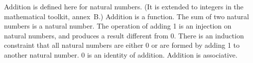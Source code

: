 \documentclass{article}
\begin{document}
Addition is defined here for natural numbers.
(It is extended to integers in the mathematical toolkit,
annex~B.)
Addition is a function.
The sum of two natural numbers is a natural number.
The operation of adding 1 is an injection on natural numbers,
and produces a result different from 0.
There is an induction constraint that all natural numbers are
either 0 or are formed by adding 1 to another natural number.
0 is an identity of addition.
Addition is associative.

\end{document}
